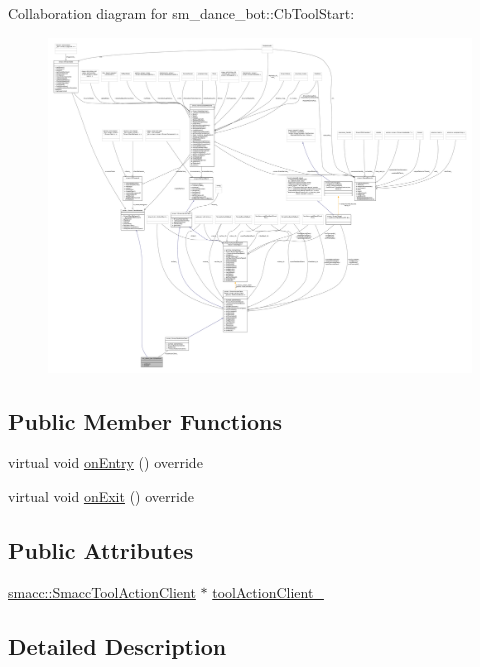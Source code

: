 Collaboration diagram for sm\+\_\+dance\+\_\+bot\+:\+:Cb\+Tool\+Start\+:
\nopagebreak
\begin{figure}[H]
\begin{center}
\leavevmode
\includegraphics[width=350pt]{classsm__dance__bot_1_1CbToolStart__coll__graph}
\end{center}
\end{figure}
\subsection*{Public Member Functions}
\begin{DoxyCompactItemize}
\item 
virtual void \hyperlink{classsm__dance__bot_1_1CbToolStart_ada528d3305c51d88ee9dace1087b258a}{on\+Entry} () override
\item 
virtual void \hyperlink{classsm__dance__bot_1_1CbToolStart_a5cb9f2b22b8039e3745f997cd2301775}{on\+Exit} () override
\end{DoxyCompactItemize}
\subsection*{Public Attributes}
\begin{DoxyCompactItemize}
\item 
\hyperlink{classsmacc_1_1SmaccToolActionClient}{smacc\+::\+Smacc\+Tool\+Action\+Client} $\ast$ \hyperlink{classsm__dance__bot_1_1CbToolStart_af0d815c686d7f5cc6d16c3f8ec2443c4}{tool\+Action\+Client\+\_\+}
\end{DoxyCompactItemize}


\subsection{Detailed Description}


